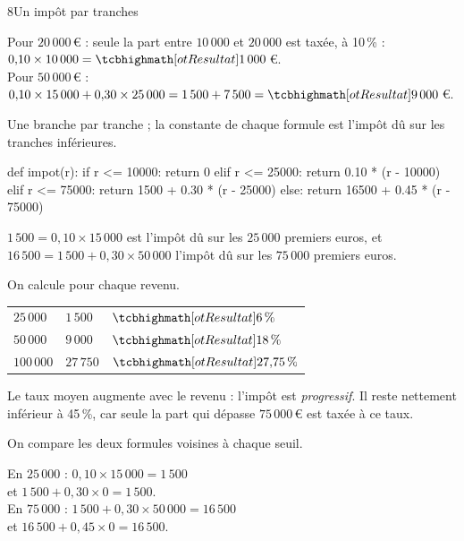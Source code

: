 \begin{corrige}{8}{Un impôt par tranches}
\begin{questions}
  \item Pour $20\,000$\,€ : seule la part entre $10\,000$ et $20\,000$ est taxée, à 10\,\% : $0{,}10\times10\,000=\res{1\,000}$\,€.\\
    Pour $50\,000$\,€ : $0{,}10\times15\,000+0{,}30\times25\,000=1\,500+7\,500=\res{9\,000}$\,€.
  \item Une branche par tranche ; la constante de chaque formule est l'impôt dû sur les tranches inférieures.
\begin{codecote}[0.61]
\begin{pythoncol}
def impot(r):
    if r <= 10000:
        return 0
    elif r <= 25000:
        return 0.10 * (r - 10000)
    elif r <= 75000:
        return 1500 + 0.30 * (r - 25000)
    else:
        return 16500 + 0.45 * (r - 75000)
\end{pythoncol}
\cote
$1\,500=0{,}10\times15\,000$ est l'impôt dû sur les $25\,000$ premiers euros, et $16\,500=1\,500+0{,}30\times50\,000$ l'impôt dû sur les
$75\,000$ premiers euros.
\end{codecote}
  \item On calcule  pour chaque revenu.
\begin{codecote}[0.5]
{\renewcommand{\arraystretch}{1.35}%
\begin{tabularx}{\linewidth}{@{}YYY@{}}
\toprule
{} &  &  \\
\midrule
$25\,000$ & $1\,500$ & $\res{6\,\%}$ \\
$50\,000$ & $9\,000$ & $\res{18\,\%}$ \\
$100\,000$ & $27\,750$ & $\res{27{,}75\,\%}$ \\
\bottomrule
\end{tabularx}}
\cote
Le taux moyen augmente avec le revenu : l'impôt est \emph{progressif}. Il reste nettement inférieur à 45\,\%, car seule la part qui
dépasse $75\,000$\,€ est taxée à ce taux.
\end{codecote}
  \item On compare les deux formules voisines à chaque seuil.
\begin{codecote}[0.5]
\raggedright
\vspace{0.5mm}
En $25\,000$ : $0{,}10\times15\,000=1\,500$\\ et $1\,500+0{,}30\times0=1\,500$.\\[1mm]
En $75\,000$ : $1\,500+0{,}30\times50\,000=16\,500$\\ et $16\,500+0{,}45\times0=16\,500$.\\[1.5mm]

\end{codecote}
\end{questions}
\end{corrige}
